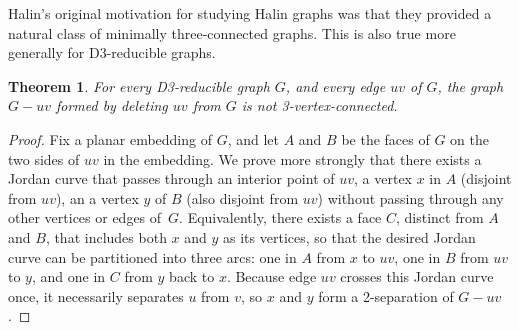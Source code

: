 \documentclass{article}
\newtheorem{theorem}{Theorem}
\begin{document}
Halin's original motivation for studying Halin graphs was that they provided a natural class of minimally three-connected graphs. This is also true more generally for D3-reducible graphs.

\begin{theorem}
For every D3-reducible graph $G$, and every edge $uv$ of $G$, the graph $G-uv$ formed by deleting $uv$ from $G$ is not 3-vertex-connected.
\end{theorem}

\begin{proof}
Fix a planar embedding of $G$, and let $A$ and $B$ be the faces of $G$ on the two sides of $uv$ in the embedding. We prove more strongly that there exists a Jordan curve that passes through an interior point of $uv$, a vertex $x$ in $A$ (disjoint from $uv$), an a vertex $y$ of $B$ (also disjoint from $uv$) without passing through any other vertices or edges of~$G$. Equivalently, there exists a face $C$, distinct from $A$ and $B$, that includes both $x$ and $y$ as its vertices, so that the desired Jordan curve can be partitioned into three arcs: one in $A$ from $x$ to $uv$, one in $B$ from $uv$ to $y$, and one in $C$ from $y$ back to $x$. Because edge $uv$ crosses this Jordan curve once, it necessarily separates $u$ from $v$, so $x$ and $y$ form a 2-separation of $G-uv$.


\end{proof}
\end{document}
